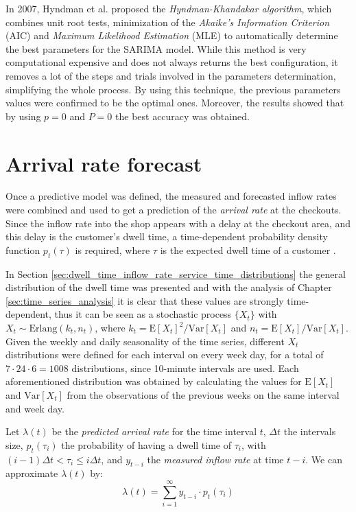 In 2007, Hyndman et al. \cite{hyndman2007} proposed the \emph{Hyndman-Khandakar algorithm}, which combines unit root tests, minimization of the \emph{Akaike’s Information Criterion} (AIC) and \emph{Maximum Likelihood Estimation} (MLE) to automatically determine the best parameters for the SARIMA model. While this method is very computational expensive and does not always returns the best configuration, it removes a lot of the steps and trials involved in the parameters determination, simplifying the whole process. By using this technique, the previous parameters values were confirmed to be the optimal ones. Moreover, the results showed that by using \( p = 0 \) and \( P = 0 \) the best accuracy was obtained.

\section{Arrival rate forecast}
\label{sec:arrival_rate_forecast}

Once a predictive model was defined, the measured and forecasted inflow rates were combined and used to get a prediction of the \emph{arrival rate} at the checkouts. Since the inflow rate into the shop appears with a delay at the checkout area, and this delay is the customer's dwell time, a time-dependent probability density function \( p_t(\tau) \) is required, where \( \tau \) is the expected dwell time of a customer \cite{aksu}.

In Section \ref{sec:dwell_time_inflow_rate_service_time_distributions} the general distribution of the dwell time was presented and with the analysis of Chapter \ref{sec:time_series_analysis} it is clear that these values are strongly time-dependent, thus it can be seen as a stochastic process \( \{ X_t \} \) with \( X_t \sim \text{Erlang}(k_t, n_t) \), where \( k_t = \text{E}[X_t]^2 / \text{Var}[X_t] \) and \( n_t =  \text{E}[X_t] / \text{Var}[X_t] \). Given the weekly and daily seasonality of the time series, different \( X_t \) distributions were defined for each interval on every week day, for a total of \( 7 \cdot 24 \cdot 6 = 1008 \) distributions, since 10-minute intervals are used. Each aforementioned distribution was obtained by calculating the values for \( \text{E}[X_t] \) and \( \text{Var}[X_t] \) from the observations of the previous weeks on the same interval and week day.

Let \( \lambda(t) \) be the \emph{predicted arrival rate} for the time interval \( t \), \( \Delta t \) the intervals size, \( p_t(\tau_i) \) the probability of having a dwell time of \( \tau_i \), with \( (i-1) \Delta t < \tau_i \leq i \Delta t \), and \( y_{t-i} \) the \emph{measured inflow rate} at time \( t-i \). We can approximate \( \lambda(t) \) by:
\begin{equation}
  \lambda(t) = \sum_{i=1}^{\infty} y_{t-i} \cdot p_t(\tau_i)
\end{equation}

